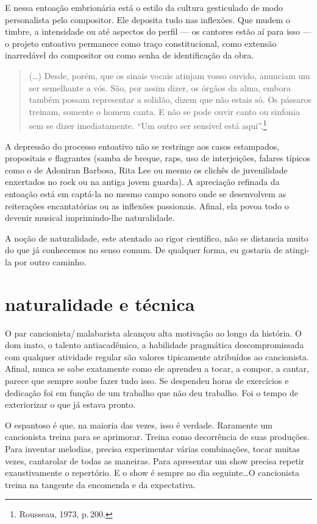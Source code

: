 E nessa entoação embrionária está o estilo da cultura gesticulado de
modo personalista pelo compositor. Ele deposita tudo nas inflexões. Que
mudem o timbre, a intensidade ou até aspectos do perfil --- os cantores
estão aí para isso --- o projeto entoativo permanece como traço
constitucional, como extensão inarredável do compositor ou como senha de
identificação da obra.

\begin{quote}
(\ldots) Desde, porém, que os sinais vocais atinjam vosso ouvido, anunciam
um ser semelhante a vós. São, por assim dizer, os órgãos da alma, embora
também possam representar a solidão, dizem que não estais só. Os
pássaros treinam, somente o homem canta. E não se pode ouvir canto ou
sinfonia sem se dizer imediatamente. ``Um outro ser sensível está aqui''.\footnote{Rousseau, 1973, p.\,200.}
\end{quote}

A depressão do processo entoativo não se restringe aos casos estampados,
propositais e flagrantes (samba de breque, raps, uso de interjeições,
falares típicos como o de Adoniran Barbosa, Rita Lee ou mesmo os clichês
de juvenilidade enxertados no rock ou na antiga jovem guarda). A
apreciação refinada da entoação está em captá-la no mesmo campo sonoro
onde se desenvolvem as reiterações encantatórias ou as inflexões
passionais. Afinal, ela povoa todo o devenir musical imprimindo-lhe
naturalidade.

A noção de naturalidade, este atentado ao rigor científico, não se
distancia muito do que já conhecemos no senso comum. De qualquer forma,
eu gostaria de atingi-la por outro caminho.

\section{naturalidade e técnica}

O par cancionista/\,malabarista alcançou alta motivação ao longo da
história. O dom inato, o talento antiacadêmico, a habilidade pragmática
descompromissada com qualquer atividade regular são valores tipicamente
atribuídos ao cancionista. Afinal, nunca se sabe exatamente como ele
aprendeu a tocar, a compor, a cantar, parece que sempre soube fazer tudo
isso. Se despendeu horas de exercícios e dedicação foi em função de um
trabalho que não deu trabalho. Foi o tempo de exteriorizar o que já
estava pronto.

O espantoso é que, na maioria das vezes, isso é verdade. Raramente um
cancionista treina para se aprimorar. Treina como decorrência de suas
produções. Para inventar melodias, precisa experimentar várias
combinações, tocar muitas vezes, cantarolar de todas as maneiras. Para
apresentar um show precisa repetir exaustivamente o repertório. E o show
é sempre no dia seguinte\ldots O cancionista treina na tangente da
encomenda e da expectativa.

